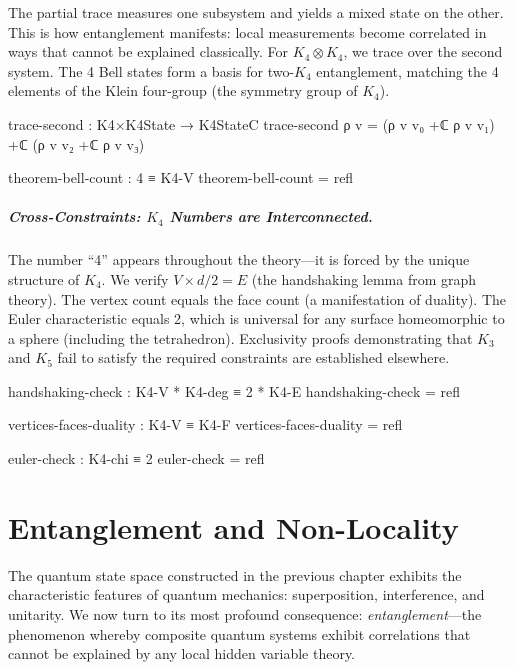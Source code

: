 \documentclass[11pt,a4paper]{book}
\begin{document}
The partial trace measures one subsystem and yields a mixed state on the other. This is how entanglement manifests: local measurements become correlated in ways that cannot be explained classically. For $K_4 \otimes K_4$, we trace over the second system. The 4 Bell states form a basis for two-$K_4$ entanglement, matching the 4 elements of the Klein four-group (the symmetry group of $K_4$).

\begin{code}
trace-second : K4×K4State → K4StateC
trace-second ρ v = (ρ v v₀ +ℂ ρ v v₁) +ℂ (ρ v v₂ +ℂ ρ v v₃)

theorem-bell-count : 4 ≡ K4-V
theorem-bell-count = refl
\end{code}

\paragraph{Cross-Constraints: $K_4$ Numbers are Interconnected.}
The number ``4'' appears throughout the theory---it is forced by the unique structure of $K_4$. We verify $V \times d / 2 = E$ (the handshaking lemma from graph theory). The vertex count equals the face count (a manifestation of duality). The Euler characteristic equals 2, which is universal for any surface homeomorphic to a sphere (including the tetrahedron). Exclusivity proofs demonstrating that $K_3$ and $K_5$ fail to satisfy the required constraints are established elsewhere.

\begin{code}
handshaking-check : K4-V * K4-deg ≡ 2 * K4-E
handshaking-check = refl

vertices-faces-duality : K4-V ≡ K4-F
vertices-faces-duality = refl

euler-check : K4-chi ≡ 2
euler-check = refl
\end{code}

\chapter{Entanglement and Non-Locality}
\label{chap:entanglement}

The quantum state space constructed in the previous chapter exhibits the characteristic features of quantum mechanics: superposition, interference, and unitarity. We now turn to its most profound consequence: \emph{entanglement}---the phenomenon whereby composite quantum systems exhibit correlations that cannot be explained by any local hidden variable theory.
\end{document}
